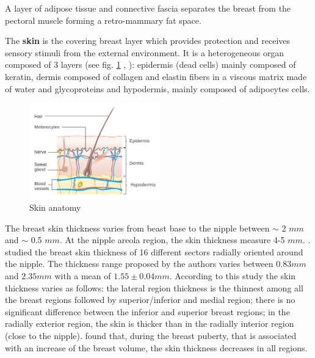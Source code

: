  A layer of adipose tissue and connective fascia separates the breast from the pectoral muscle forming a retro-mammary fat space.
 
The \textbf{skin} is the covering breast layer which provides protection and receives sensory stimuli from the external environment. It is a heterogeneous organ composed of 3 layers (see fig. \ref{fig:skinanatomy} , \citep{kanitakis2002anatomy} ): epidermis (dead cells) mainly composed of keratin, dermis composed of collagen and elastin fibers in a viscous matrix made of water and glycoproteins and hypodermis, mainly composed of adipocytes cells.


\begin{figure}[!h]
\centering
\centerline{\includegraphics[width=0.5\textwidth,keepaspectratio]{figures/skin_2.jpg} }
\caption{Skin anatomy}
\label{fig:skinanatomy}
\end{figure}



The breast skin thickness varies from beast base to the nipple between $\sim$ 2 $mm$ and $\sim$ 0.5 $mm$. At the nipple areola region, the skin thickness measure 4-5 $mm$.
 \citep{andolina2011mammographic}. \cite{sutradhar_vivo_2013} studied the breast skin thickness of 16 different sectors radially oriented around the nipple. The thickness range proposed by the authors varies between $0.83 mm$ and $2.35 mm$ with a mean of $1.55 \pm 0.04 mm$. According to this study the skin thickness varies as follows: the lateral
region thickness is the thinnest among all the breast regions followed by superior/inferior and medial region; there is no significant difference between the inferior and superior breast regions; in the radially exterior region, the skin is thicker than in the radially interior region (close to the nipple).  \cite{ulger2003effect} found that, during the breast puberty, that is associated with an increase of the breast volume, the skin thickness decreases in all regions.

